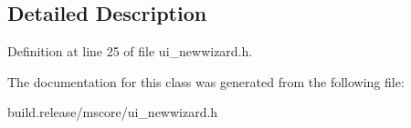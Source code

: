 \subsection{Detailed Description}


Definition at line 25 of file ui\+\_\+newwizard.\+h.



The documentation for this class was generated from the following file\+:\begin{DoxyCompactItemize}
\item 
build.\+release/mscore/ui\+\_\+newwizard.\+h\end{DoxyCompactItemize}
